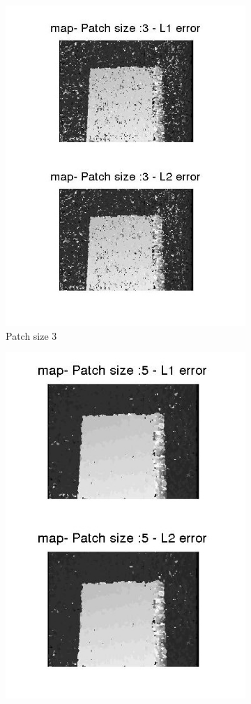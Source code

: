 \documentclass[fleqn]{article}
\begin{document}
\begin{figure}[!ht]
\begin{subfigure}{0.3\textwidth}
\includegraphics[scale=0.3]{./pics/map_disparity_patchsize_3.jpg}
\caption{Patch size 3}
\end{subfigure}%
 \begin{subfigure}{0.3\textwidth}
 \centering
\includegraphics[scale=0.3]{./pics/map_disparity_patchsize_5.jpg}

\end{subfigure}
\end{figure}
\end{document}
